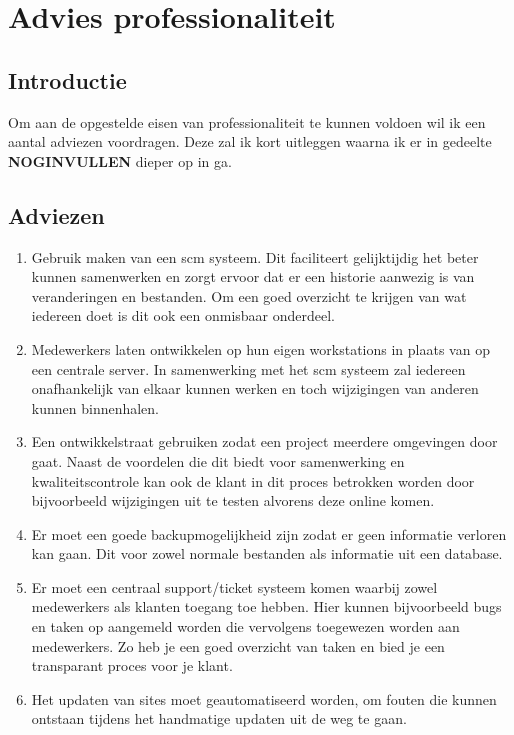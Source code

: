 \chapter{Advies professionaliteit}

\section{Introductie}

Om aan de opgestelde eisen van professionaliteit te kunnen voldoen wil ik een aantal adviezen voordragen. Deze zal ik kort uitleggen waarna ik er in gedeelte \textbf{NOGINVULLEN} dieper op in ga.

\section{Adviezen}

\begin{enumerate}
  \item Gebruik maken van een {\sc scm} systeem. Dit faciliteert gelijktijdig het beter kunnen samenwerken en zorgt ervoor dat er een historie aanwezig is van veranderingen en bestanden. Om een goed overzicht te krijgen van wat iedereen doet is dit ook een onmisbaar onderdeel.
  \item Medewerkers laten ontwikkelen op hun eigen workstations in plaats van op een centrale server. In samenwerking met het {\sc scm} systeem zal iedereen onafhankelijk van elkaar kunnen werken en toch wijzigingen van anderen kunnen binnenhalen.
  \item Een ontwikkelstraat gebruiken zodat een project meerdere omgevingen door gaat. Naast de voordelen die dit biedt voor samenwerking en kwaliteitscontrole kan ook de klant in dit proces betrokken worden door bijvoorbeeld wijzigingen uit te testen alvorens deze online komen.
  \item Er moet een goede backupmogelijkheid zijn zodat er geen informatie verloren kan gaan. Dit voor zowel normale bestanden als informatie uit een database.
  \item Er moet een centraal support/ticket systeem komen waarbij zowel medewerkers als klanten toegang toe hebben. Hier kunnen bijvoorbeeld bugs en taken op aangemeld worden die vervolgens toegewezen worden aan medewerkers. Zo heb je een goed overzicht van taken en bied je een transparant proces voor je klant.
  \item Het updaten van sites moet geautomatiseerd worden, om fouten die kunnen ontstaan tijdens het handmatige updaten uit de weg te gaan.
  
\end{enumerate}
